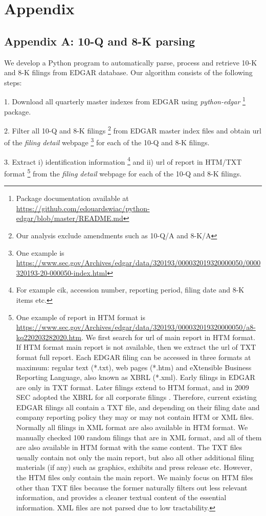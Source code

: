 \section*{Appendix}
\subsection*{Appendix A: 10-Q and 8-K parsing}
\label{appa}
We develop a Python program to automatically parse, process and retrieve 10-K and 8-K filings from EDGAR database. Our algorithm consists of the following steps:

1. Download all quarterly master indexes from EDGAR using \textit{python-edgar} \footnote{Package documentation available at \url{https://github.com/edouardswiac/python-edgar/blob/master/README.md}} package.

2. Filter all 10-Q and 8-K filings \footnote{Our analysis exclude amendments such as 10-Q/A and 8-K/A} from EDGAR master index files and obtain url of the \textit{filing detail} webpage \footnote{One example is \url{https://www.sec.gov/Archives/edgar/data/320193/000032019320000050/0000320193-20-000050-index.html}} for each of the 10-Q and 8-K filings. 

3. Extract i) identification information \footnote{For example cik, accession number, reporting period, filing date and 8-K items etc.} and ii) url of report in HTM/TXT format \footnote{One example of report in HTM format is \url{https://www.sec.gov/Archives/edgar/data/320193/000032019320000050/a8-kq220203282020.htm}. We first search for url of main report in HTM format. If HTM format main report is not available, then we extract the url of TXT format full report. Each EDGAR filing can be accessed in three formats at maximum: regular text (*.txt), web pages (*.htm) and eXtensible Business Reporting Language, also known as XBRL (*.xml). Early filings in EDGAR are only in TXT format. Later filings extend to HTM format, and in 2009 SEC adopted the XBRL for all corporate filings \cite{secFinalRuleInteractive2009}. Therefore, current existing EDGAR filings all contain a TXT file, and depending on their filing date and company reporting policy they may or may not contain HTM or XML files. Normally all filings in XML format are also available in HTM format. We manually checked 100 random filings that are in XML format, and all of them are also available in HTM format with the same content. The TXT files usually contain not only the main report, but also all other additional filing materials (if any) such as graphics, exhibits and press release etc. However, the HTM files only contain the main report. We mainly focus on HTM files other than TXT files because the former naturally filters out less relevant information, and provides a cleaner textual content of the essential information. XML files are not parsed due to low tractability. } from the \textit{filing detail} webpage for each of the 10-Q and 8-K filings. 

